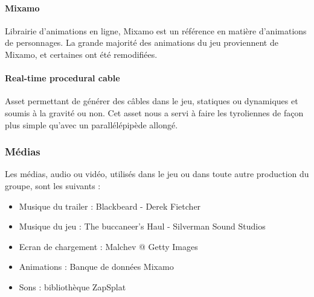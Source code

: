         \paragraph{Mixamo} Librairie d'animations en ligne, Mixamo est un référence en matière d'animations de personnages. La grande 
        majorité des animations du jeu proviennent de Mixamo, et certaines ont été remodifiées.

        \paragraph{Real-time procedural cable} Asset permettant de générer des câbles dans le jeu, statiques ou dynamiques et soumis 
        à la gravité ou non. Cet asset nous a servi à faire les tyroliennes de façon plus simple qu'avec un parallélépipède allongé. 

        \paragraph{}

        
    \subsubsection{Médias}

        Les médias, audio ou vidéo, utilisés dans le jeu ou dans toute autre production du groupe, sont les suivants :

        \begin{itemize}
            \item Musique du trailer : Blackbeard - Derek Fietcher
            \item Musique du jeu : The buccaneer's Haul - Silverman Sound Studios
            \item Ecran de chargement : Malchev @ Getty Images
            \item Animations : Banque de données Mixamo
            \item Sons : bibliothèque ZapSplat
        \end{itemize}
